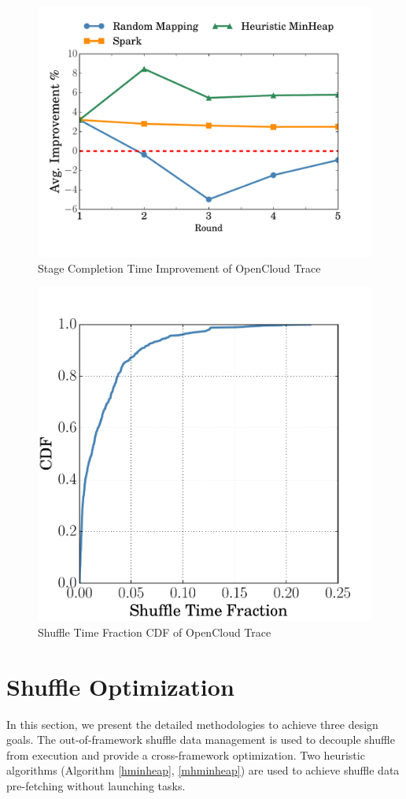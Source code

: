 \begin{figure}
	\centering
	\includegraphics[width=0.75\linewidth]{fig/sim}
	\caption{Stage Completion Time Improvement of OpenCloud Trace}
	\label{fig:sim}
\end{figure}

\begin{figure}
	\centering
	\includegraphics[width=0.6\linewidth]{fig/reduce_cdf}
	\caption{Shuffle Time Fraction CDF of OpenCloud Trace}
	\label{fig:cdf}
\end{figure}

\section{Shuffle Optimization}\label{opt}
In this section, we present the detailed methodologies to achieve three design goals. The out-of-framework shuffle data management is used to decouple shuffle from execution and provide a cross-framework optimization. Two heuristic algorithms (Algorithm \ref{hminheap}, \ref{mhminheap}) are used to achieve shuffle data pre-fetching without launching tasks.

